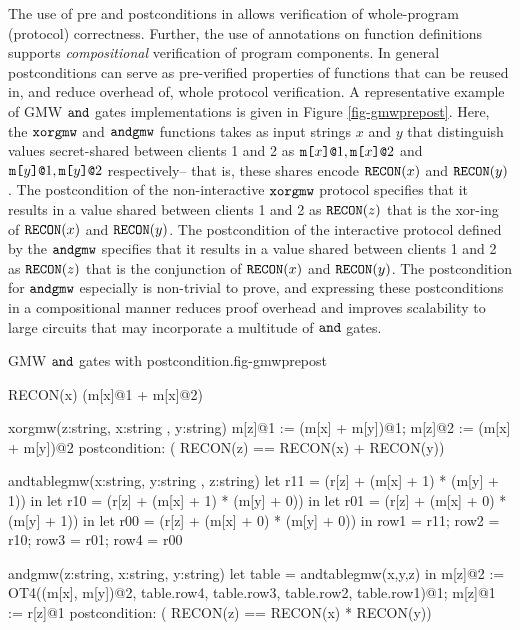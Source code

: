 The use of pre and postconditions in  allows verification of
whole-program (protocol) correctness. Further, the use of annotations
on function definitions supports \emph{compositional} verification of
program components. In general postconditions can serve as
pre-verified properties of functions that can be reused in, and reduce
overhead of, whole protocol verification. A representative example of
GMW $\texttt{and}$ gates \cite{evans2018pragmatic} implementations is
given in Figure \ref{fig-gmwprepost}. Here, the $\texttt{xorgmw}$ and
$\texttt{andgmw}$ functions takes as input strings $x$ and $y$ that
distinguish values secret-shared between clients 1 and 2 as
$\texttt{m[}x\texttt{]}\texttt{@}1, \texttt{m[}x\texttt{]}\texttt{@}2$ and $\texttt{m[}y\texttt{]}\texttt{@}1,\texttt{m[}y\texttt{]}\texttt{@}2$ respectively-- that
is, these shares encode $\texttt{RECON}(x)$ and $\texttt{RECON}(y)$.  The
postcondition of the non-interactive $\texttt{xorgmw}$ protocol specifies
that it results in a value shared between clients 1 and 2 as
$\texttt{RECON}(z)$ that is the xor-ing of $\texttt{RECON}(x)$ and
$\texttt{RECON}(y)$. The postcondition of the interactive protocol
defined by the $\texttt{andgmw}$ specifies that it results in a value
shared between clients 1 and 2 as $\texttt{RECON}(z)$ that is the
conjunction of $\texttt{RECON}(x)$ and $\texttt{RECON}(y)$. The
postcondition for $\texttt{andgmw}$ especially is non-trivial to prove,
and expressing these postconditions in a compositional manner reduces
proof overhead and improves scalability to large circuits that may
incorporate a multitude of $\texttt{and}$ gates.

\begin{fpfig}[t]{GMW $\texttt{and}$ gates with postcondition.}{fig-gmwprepost}
\begin{verbatimtab}
RECON(x) { (m[x]@1 + m[x]@2) }

xorgmw(z:string, x:string , y:string) {
  m[z]@1 := (m[x] + m[y])@1;
  m[z]@2 := (m[x] + m[y])@2
}
postcondition:  ( RECON(z) == RECON(x) + RECON(y))

andtablegmw(x:string, y:string , z:string) {
  let r11 = (r[z] + (m[x] + 1) * (m[y] + 1)) in
  let r10 = (r[z] + (m[x] + 1) * (m[y] + 0)) in
  let r01 = (r[z] + (m[x] + 0) * (m[y] + 1)) in
  let r00 = (r[z] + (m[x] + 0) * (m[y] + 0)) in
  { row1 = r11; row2 = r10; row3 = r01; row4 = r00 }
}

andgmw(z:string, x:string, y:string) {
  let table = andtablegmw(x,y,z) in
  m[z]@2 := OT4((m[x], m[y])@2, table.row4, table.row3, table.row2, table.row1)@1;
  m[z]@1 := r[z]@1
}
postcondition:  ( RECON(z) == RECON(x) * RECON(y))
\end{verbatimtab}
\end{fpfig}


